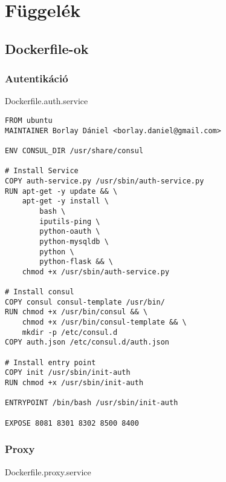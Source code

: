 \appendix

\chapter{Függelék}\label{fuxfcggeluxe9k}

\section{\texorpdfstring{Dockerfile-ok\label{appendix-dockerfile}}{Dockerfile-ok}}\label{dockerfile-ok}

\subsection{Autentikáció}\label{autentikuxe1ciuxf3}

Dockerfile.auth.service

\begin{verbatim}
FROM ubuntu
MAINTAINER Borlay Dániel <borlay.daniel@gmail.com>

ENV CONSUL_DIR /usr/share/consul

# Install Service
COPY auth-service.py /usr/sbin/auth-service.py
RUN apt-get -y update && \
    apt-get -y install \
        bash \
        iputils-ping \
        python-oauth \
        python-mysqldb \
        python \
        python-flask && \
    chmod +x /usr/sbin/auth-service.py

# Install consul
COPY consul consul-template /usr/bin/
RUN chmod +x /usr/bin/consul && \
    chmod +x /usr/bin/consul-template && \
    mkdir -p /etc/consul.d
COPY auth.json /etc/consul.d/auth.json

# Install entry point
COPY init /usr/sbin/init-auth
RUN chmod +x /usr/sbin/init-auth

ENTRYPOINT /bin/bash /usr/sbin/init-auth

EXPOSE 8081 8301 8302 8500 8400
\end{verbatim}

\subsection{Proxy}\label{proxy}

Dockerfile.proxy.service

